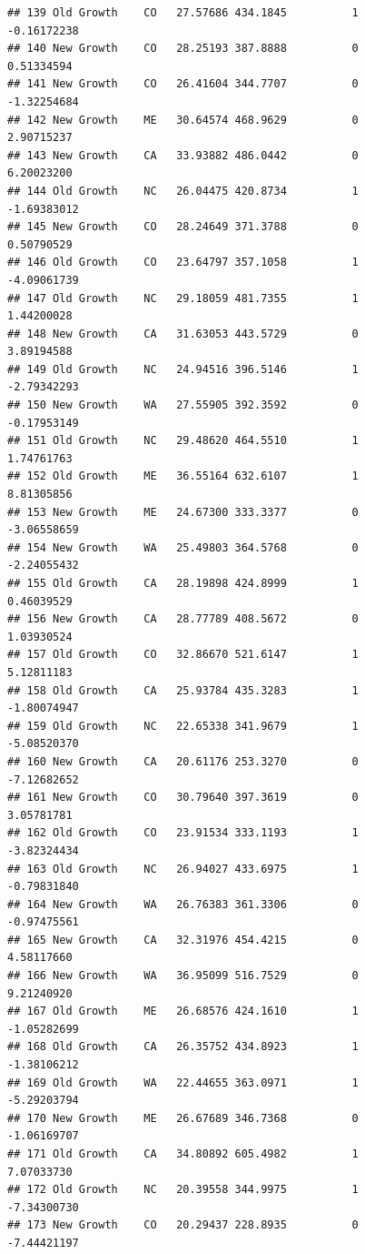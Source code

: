 \documentclass[
]{article}
\begin{document}
\begin{verbatim}
## 139 Old Growth    CO   27.57686 434.1845          1         -0.16172238
## 140 New Growth    CO   28.25193 387.8888          0          0.51334594
## 141 New Growth    CO   26.41604 344.7707          0         -1.32254684
## 142 New Growth    ME   30.64574 468.9629          0          2.90715237
## 143 New Growth    CA   33.93882 486.0442          0          6.20023200
## 144 Old Growth    NC   26.04475 420.8734          1         -1.69383012
## 145 New Growth    CO   28.24649 371.3788          0          0.50790529
## 146 Old Growth    CO   23.64797 357.1058          1         -4.09061739
## 147 Old Growth    NC   29.18059 481.7355          1          1.44200028
## 148 New Growth    CA   31.63053 443.5729          0          3.89194588
## 149 Old Growth    NC   24.94516 396.5146          1         -2.79342293
## 150 New Growth    WA   27.55905 392.3592          0         -0.17953149
## 151 Old Growth    NC   29.48620 464.5510          1          1.74761763
## 152 Old Growth    ME   36.55164 632.6107          1          8.81305856
## 153 New Growth    ME   24.67300 333.3377          0         -3.06558659
## 154 New Growth    WA   25.49803 364.5768          0         -2.24055432
## 155 Old Growth    CA   28.19898 424.8999          1          0.46039529
## 156 New Growth    CA   28.77789 408.5672          0          1.03930524
## 157 Old Growth    CO   32.86670 521.6147          1          5.12811183
## 158 Old Growth    CA   25.93784 435.3283          1         -1.80074947
## 159 Old Growth    NC   22.65338 341.9679          1         -5.08520370
## 160 New Growth    CA   20.61176 253.3270          0         -7.12682652
## 161 New Growth    CO   30.79640 397.3619          0          3.05781781
## 162 Old Growth    CO   23.91534 333.1193          1         -3.82324434
## 163 Old Growth    NC   26.94027 433.6975          1         -0.79831840
## 164 New Growth    WA   26.76383 361.3306          0         -0.97475561
## 165 New Growth    CA   32.31976 454.4215          0          4.58117660
## 166 New Growth    WA   36.95099 516.7529          0          9.21240920
## 167 Old Growth    ME   26.68576 424.1610          1         -1.05282699
## 168 Old Growth    CA   26.35752 434.8923          1         -1.38106212
## 169 Old Growth    WA   22.44655 363.0971          1         -5.29203794
## 170 New Growth    ME   26.67689 346.7368          0         -1.06169707
## 171 Old Growth    CA   34.80892 605.4982          1          7.07033730
## 172 Old Growth    NC   20.39558 344.9975          1         -7.34300730
## 173 New Growth    CO   20.29437 228.8935          0         -7.44421197

\end{verbatim}
\end{document}
